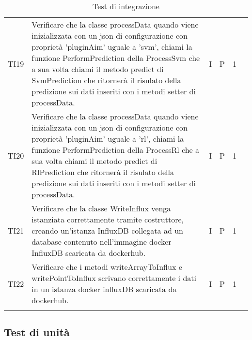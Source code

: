 \begin{longtable} {
		>{}p{12mm}
		>{}p{79.5mm}
		>{}p{9mm}
		>{}p{8mm}
		>{}p{14mm}
		>{}p{0mm}}
	TI19	& Verificare che la classe processData quando viene inizializzata con un json di configurazione con proprietà 'pluginAim' uguale a 'svm', chiami la funzione PerformPrediction della ProcessSvm che a sua volta chiami il metodo predict di SvmPrediction che ritornerà il risulato della predizione sui dati inseriti con i metodi setter di processData. & I & P & 1 & \TBstrut \\ [2mm]
	TI20	& Verificare che la classe processData quando viene inizializzata con un json di configurazione con proprietà 'pluginAim' uguale a 'rl', chiami la funzione PerformPrediction della ProcessRl che a sua volta chiami il metodo predict di RlPrediction che ritornerà il risulato della predizione sui dati inseriti con i metodi setter di processData. & I & P & 1 & \TBstrut \\ [2mm]
	TI21	& Verificare che la classe WriteInflux venga istanziata correttamente tramite costruttore, creando un'istanza InfluxDB collegata ad un database contenuto nell'immagine docker InfluxDB scaricata da dockerhub. & I & P & 1 & \TBstrut \\ [2mm]
	TI22	& Verificare che i metodi writeArrayToInflux e writePointToInflux scrivano correttamente i dati in un istanza docker influxDB scaricata da dockerhub. & I & P & 1 & \TBstrut \\ [2mm]
	
	\rowcolor{white}
	\caption{Test di integrazione}
\end{longtable}



\subsection{Test di unità}

